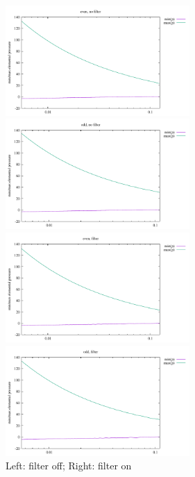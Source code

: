 \begin{center}
\includegraphics[width=7cm]{python_codes/fieldstone_12/results/punch/rawp_even_nofilter}
\includegraphics[width=7cm]{python_codes/fieldstone_12/results/punch/rawp_odd_nofilter}\\
\includegraphics[width=7cm]{python_codes/fieldstone_12/results/punch/rawp_even_filter}
\includegraphics[width=7cm]{python_codes/fieldstone_12/results/punch/rawp_odd_filter}\\
{\captionfont Left: filter off; Right: filter on}
\end{center}

